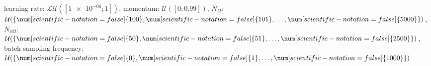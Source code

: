 learning rate: $\mathcal{LU}([\num[scientific-notation=true]{1e-06}; \num[scientific-notation=false]{1}])$, momentum: $\mathcal{U}([\num[scientific-notation=false]{0}; \num[scientific-notation=true]{0.99}])$, $N_{\Omega}$: $\mathcal{U}(\{\num[scientific-notation=false]{100},\num[scientific-notation=false]{101},\text{\dots},\num[scientific-notation=false]{5000}\})$, $N_{\partial\Omega}$: $\mathcal{U}(\{\num[scientific-notation=false]{50},\num[scientific-notation=false]{51},\text{\dots},\num[scientific-notation=false]{2500}\})$, batch sampling frequency: $\mathcal{U}(\{\num[scientific-notation=false]{0},\num[scientific-notation=false]{1},\text{\dots},\num[scientific-notation=false]{1000}\})$